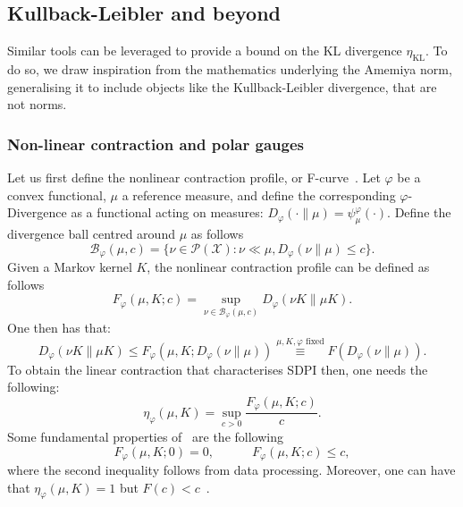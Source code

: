 \documentclass[11pt]{article}
\newcommand{\X}{\mathcal{X}}
\newcommand{\B}{\mathcal{B}}
\theoremstyle{plain}
\theoremstyle{remark}
\begin{document}
\subsection{Kullback-Leibler and beyond}
    Similar tools can be leveraged to provide a bound on the KL divergence $\eta_{\mathrm{KL}}$. To do so, we draw inspiration from the mathematics underlying the Amemiya norm, generalising it to include objects like the Kullback-Leibler divergence, that are not norms.
    \subsubsection{Non-linear contraction and polar gauges}
   Let us first define the nonlinear contraction profile, or F-curve~\cite{contractionInputConstraint}.
   Let $\varphi$ be a convex functional, %
   $\mu$ a reference measure, and define the corresponding $\varphi$-Divergence as a functional acting on measures: $D_\varphi(\cdot\|\mu) = \psi_\mu^\varphi(\cdot)$. Define the divergence ball centred around $\mu$ as follows
   \begin{equation}
       \mathcal{B}_\varphi(\mu,c) = \{\nu\in \mathcal{P}(\X) : \nu\ll\mu , D_\varphi(\nu\|\mu)\leq c\} \label{eq:phiDivBall}.
   \end{equation}
   Given a Markov kernel $K$, the nonlinear contraction profile can be defined as follows
   \begin{equation}
       F_\varphi(\mu,K; c) = \sup_{\nu \in \B_\varphi(\mu,c) } D_\varphi(\nu K\|\mu K). \label{eq:F_phiCurve}
   \end{equation}
   One then has that:
   \begin{equation}
       D_\varphi(\nu K\|\mu K) \leq F_\varphi(\mu,K; D_\varphi(\nu\|\mu)) \overset{\mu,K,\varphi \text{ fixed}}{\equiv} F(D_\varphi(\nu\|\mu)).\label{phiNonLinearContraction}
   \end{equation}
   To obtain the linear contraction that characterises SDPI then, one needs the following:
   \begin{equation}
       \eta_\varphi(\mu,K) = \sup_{c>0} \frac{F_\varphi(\mu,K;c)}{c}.
   \end{equation}
   Some fundamental properties of~ are the following
   \begin{equation}
       F_\varphi(\mu, K; 0)=0, \hspace{3em} F_\varphi(\mu,K; c)\leq c,
   \end{equation}
   where the second inequality follows from data processing. Moreover, one can have that $\eta_\varphi(\mu, K)=1$ but $F(c)<c$~\cite{contractionInputConstraint}.
\end{document}
